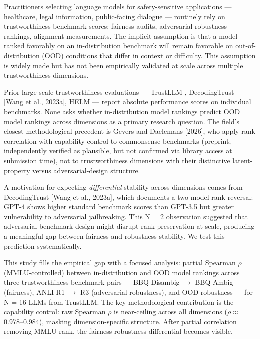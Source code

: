 
Practitioners selecting language models for safety-sensitive applications --- healthcare, legal information, public-facing dialogue --- routinely rely on trustworthiness benchmark scores: fairness audits, adversarial robustness rankings, alignment measurements. The implicit assumption is that a model ranked favorably on an in-distribution benchmark will remain favorable on out-of-distribution (OOD) conditions that differ in context or difficulty. This assumption is widely made but has not been empirically validated at scale across multiple trustworthiness dimensions.

Prior large-scale trustworthiness evaluations --- TrustLLM \citep{Sun2024TrustLLM}, DecodingTrust [Wang et al., 2023a], HELM \citep{Liang2022Holistic} --- report absolute performance scores on individual benchmarks. None asks whether in-distribution model rankings predict OOD model rankings across dimensions as a primary research question. The field's closest methodological precedent is Gevers and Daelemans [2026], who apply rank correlation with capability control to commonsense benchmarks (preprint; independently verified as plausible, but not confirmed via library access at submission time), not to trustworthiness dimensions with their distinctive latent-property versus adversarial-design structure.

A motivation for expecting \textit{differential} stability across dimensions comes from DecodingTrust [Wang et al., 2023a], which documents a two-model rank reversal: GPT-4 shows higher standard benchmark scores than GPT-3.5 but greater vulnerability to adversarial jailbreaking. This N = 2 observation suggested that adversarial benchmark design might disrupt rank preservation at scale, producing a meaningful gap between fairness and robustness stability. We test this prediction systematically.

This study fills the empirical gap with a focused analysis: partial Spearman $\rho$ (MMLU-controlled) between in-distribution and OOD model rankings across three trustworthiness benchmark pairs --- BBQ-Disambig $\rightarrow$ BBQ-Ambig (fairness), ANLI R1 $\rightarrow$ R3 (adversarial robustness), and OOD robustness --- for N = 16 LLMs from TrustLLM. The key methodological contribution is the capability control: raw Spearman $\rho$ is near-ceiling across all dimensions ($\rho \approx$ 0.978--0.984), masking dimension-specific structure. After partial correlation removing MMLU rank, the fairness-robustness differential becomes visible.

